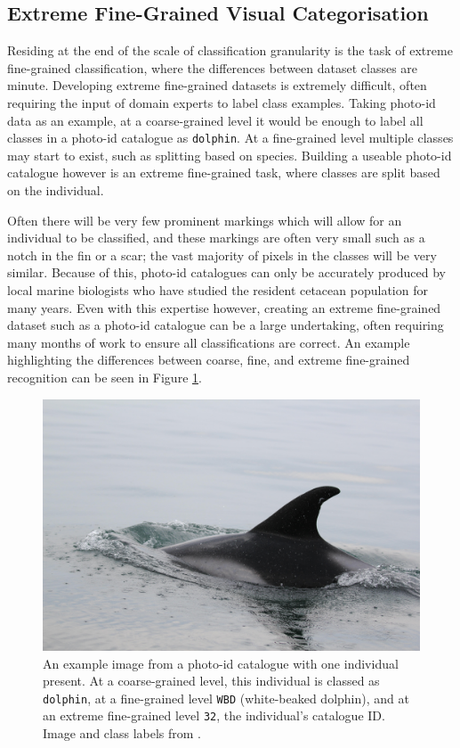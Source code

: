 \subsection{Extreme Fine-Grained Visual Categorisation}\label{ch:Background,sec:ExtremeFine-grainedCV}

Residing at the end of the scale of classification granularity is the task of extreme fine-grained classification, where the differences between dataset classes are minute. Developing extreme fine-grained datasets is extremely difficult, often requiring the input of domain experts to label class examples. Taking photo-id data as an example, at a coarse-grained level it would be enough to label all classes in a photo-id catalogue as \texttt{dolphin}. At a fine-grained level multiple classes may start to exist, such as splitting based on species. Building a useable photo-id catalogue however is an extreme fine-grained task, where classes are split based on the individual. 

Often there will be very few prominent markings which will allow for an individual to be classified, and these markings are often very small such as a notch in the fin or a scar; the vast majority of pixels in the classes will be very similar. Because of this, photo-id catalogues can only be accurately produced by local marine biologists who have studied the resident cetacean population for many years. Even with this expertise however, creating an extreme fine-grained dataset such as a photo-id catalogue can be a large undertaking, often requiring many months of work to ensure all classifications are correct. An example highlighting the differences between coarse, fine, and extreme fine-grained recognition can be seen in Figure \ref{fig:granularity-differences}.

\begin{figure}
	\begin{center}
		\includegraphics[scale=0.05]{Chapter2/figs/2192.jpg}
	\end{center}
	\caption{An example image from a photo-id catalogue with one individual present. At a coarse-grained level, this individual is classed as \texttt{dolphin}, at a fine-grained level \texttt{WBD} (white-beaked dolphin), and at an extreme fine-grained level \texttt{32}, the individual's catalogue ID. Image and class labels from \cite{trotter_ndd20_2020}.}
	\label{fig:granularity-differences}
\end{figure}

